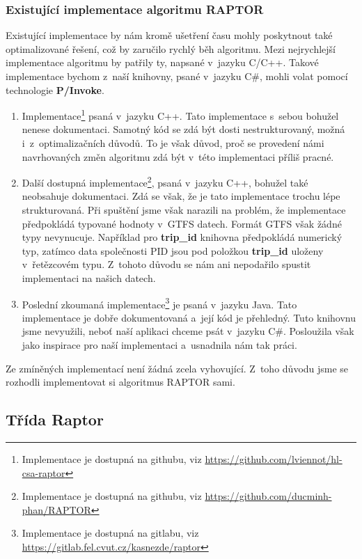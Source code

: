 \subsubsection{Existující implementace algoritmu RAPTOR}\label{raptor-existujici-implementace}

Existující implementace by nám kromě ušetření času mohly poskytnout také optimalizované řešení, což by zaručilo rychlý běh algoritmu. Mezi nejrychlejší implementace algoritmu by patřily ty, napsané v~jazyku C/C++. Takové implementace bychom z~naší knihovny, psané v~jazyku C\#, mohli volat pomocí technologie \textbf{P/Invoke}.

\begin{enumerate}
    \item Implementace\footnote{Implementace je dostupná na githubu, viz \url{https://github.com/lviennot/hl-csa-raptor}} psaná v~jazyku C++. Tato implementace s~sebou bohužel nenese dokumentaci. Samotný kód se zdá být dosti nestrukturovaný, možná i~z~optimalizačních důvodů. To je však důvod, proč se provedení námi navrhovaných změn algoritmu zdá být v~této implementaci příliš pracné.
    \item Další dostupná implementace\footnote{Implementace je dostupná na githubu, viz \url{https://github.com/ducminh-phan/RAPTOR}}, psaná v~jazyku C++, bohužel také neobsahuje dokumentaci. Zdá se však, že je tato implementace trochu lépe strukturovaná. Při spuštění jsme však narazili na problém, že implementace předpokládá typované hodnoty v~GTFS datech. Formát GTFS však žádné typy nevynucuje. Například pro \textbf{trip\_id} knihovna předpokládá numerický typ, zatímco data společnosti PID jsou pod položkou \textbf{trip\_id} uloženy v~řetězcovém typu. Z~tohoto důvodu se nám ani nepodařilo spustit implementaci na našich datech.
    \item Poslední zkoumaná implementace\footnote{Implementace je dostupná na gitlabu, viz \url{https://gitlab.fel.cvut.cz/kasnezde/raptor}} je psaná v~jazyku Java. Tato implementace je dobře dokumentovaná a~její kód je přehledný. Tuto knihovnu jsme nevyužili, neboť naší aplikaci chceme psát v~jazyku C\#. Posloužila však jako inspirace pro naší implementaci a~usnadnila nám tak práci.
\end{enumerate}

Ze zmíněných implementací není žádná zcela vyhovující. Z~toho důvodu jsme se rozhodli implementovat si algoritmus RAPTOR sami.

\subsection{Třída Raptor}


